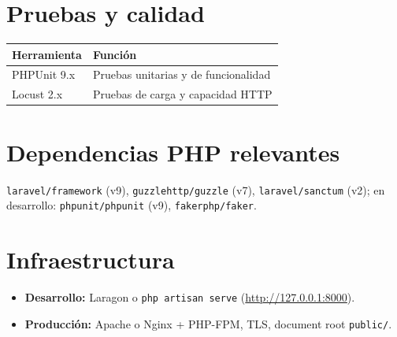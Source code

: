 \section{Pruebas y calidad}
\begin{table}[H]
  \centering
  \begin{tabular}{@{}ll@{}}
    \toprule
    \textbf{Herramienta} & \textbf{Función} \\
    \midrule
    PHPUnit 9.x & Pruebas unitarias y de funcionalidad \\
    Locust 2.x & Pruebas de carga y capacidad HTTP \\
    \bottomrule
  \end{tabular}
\end{table}

\section{Dependencias PHP relevantes}
\texttt{laravel/framework} (v9), \texttt{guzzlehttp/guzzle} (v7), \texttt{laravel/sanctum} (v2); en desarrollo: \texttt{phpunit/phpunit} (v9), \texttt{fakerphp/faker}.

\section{Infraestructura}
\begin{itemize}
  \item \textbf{Desarrollo:} Laragon o \texttt{php artisan serve} (\url{http://127.0.0.1:8000}).
  \item \textbf{Producción:} Apache o Nginx + PHP-FPM, TLS, document root \texttt{public/}.
\end{itemize}
